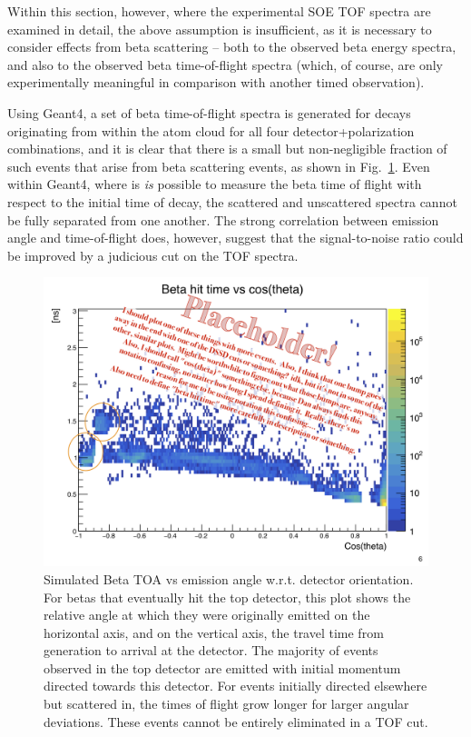 Within this section, however, where the experimental SOE TOF spectra are examined in detail, the above assumption is insufficient, as it is necessary to consider effects from beta scattering -- both to the observed beta energy spectra, and also to the observed beta time-of-flight spectra (which, of course, are only experimentally meaningful in comparison with another timed observation).  

Using Geant4, a set of beta time-of-flight spectra is generated for decays originating from within the atom cloud for all four detector+polarization combinations, and it is clear that there is a small but non-negligible fraction of such events that arise from beta scattering events, as shown in Fig.~\ref{fig:toa_vs_costheta}.  Even within Geant4, where is \emph{is} possible to measure the beta time of flight with respect to the initial time of decay, the scattered and unscattered spectra cannot be fully separated from one another.  The strong correlation between emission angle and time-of-flight does, however, suggest that the signal-to-noise ratio could be improved by a judicious cut on the TOF spectra. 

\begin{figure}[h!tb]
	\centering
	\includegraphics[width=.999\linewidth]
	{Figures/toa_vs_costheta.png}
	\caption[Simulated Beta TOA vs emission angle w.r.t. detector orientation]{Simulated Beta TOA vs emission angle w.r.t. detector orientation.  For betas that eventually hit the top detector, this plot shows the relative angle at which they were originally emitted on the horizontal axis, and on the vertical axis, the travel time from generation to arrival at the detector.  The majority of events observed in the top detector are emitted with initial momentum directed towards this detector.  For events initially directed elsewhere but scattered in, the times of flight grow longer for larger angular deviations.  These events cannot be entirely eliminated in a TOF cut.}	
	\label{fig:toa_vs_costheta}
\end{figure}

